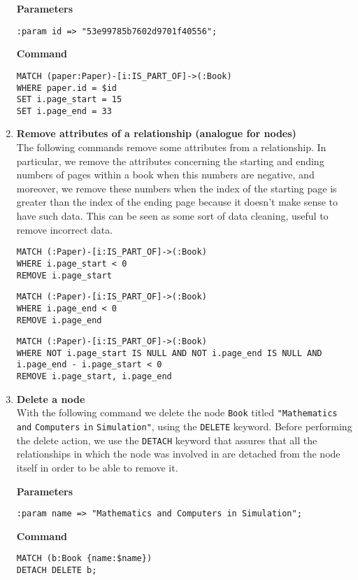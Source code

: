 \begin{enumerate}
    \textbf{Parameters}
    \begin{lstlisting}[label={lst:lstlisting13}]
:param id => "53e99785b7602d9701f40556";
    \end{lstlisting}
    \textbf{Command}
    \begin{lstlisting}[label={lst:lstlisting14}]
MATCH (paper:Paper)-[i:IS_PART_OF]->(:Book)
WHERE paper.id = $id
SET i.page_start = 15
SET i.page_end = 33
    \end{lstlisting}
    \item \textbf{Remove attributes of a relationship (analogue for nodes)}\\
    The following commands remove some attributes from a relationship.
    In particular, we remove the attributes concerning the starting and ending numbers of pages within a book when this numbers are negative, and moreover, we remove these numbers when the index of the starting page is greater than the index of the ending page because it doesn't make sense to have such data.
    This can be seen as some sort of data cleaning, useful to remove incorrect data.
    \begin{lstlisting}[label={lst:lstlisting15}]
MATCH (:Paper)-[i:IS_PART_OF]->(:Book)
WHERE i.page_start < 0
REMOVE i.page_start
    \end{lstlisting}
    \begin{lstlisting}[label={lst:lstlisting16}]
MATCH (:Paper)-[i:IS_PART_OF]->(:Book)
WHERE i.page_end < 0
REMOVE i.page_end
    \end{lstlisting}
    \begin{lstlisting}[label={lst:lstlisting17}]
MATCH (:Paper)-[i:IS_PART_OF]->(:Book)
WHERE NOT i.page_start IS NULL AND NOT i.page_end IS NULL AND i.page_end - i.page_start < 0
REMOVE i.page_start, i.page_end
    \end{lstlisting}
    \item \textbf{Delete a node}\\
    With the following command we delete the node \verb|Book| titled \verb|"Mathematics| \verb|and| \verb|Computers| \verb|in| \verb|Simulation"|, using the \verb|DELETE| keyword.
    Before performing the delete action, we use the \verb|DETACH| keyword that assures that all the relationships in which the node was involved in are detached from the node itself in order to be able to remove it.

    \textbf{Parameters}
    \begin{lstlisting}[label={lst:lstlisting18}]
:param name => "Mathematics and Computers in Simulation";
    \end{lstlisting}
    \textbf{Command}
    \begin{lstlisting}[label={lst:lstlisting19}]
MATCH (b:Book {name:$name})
DETACH DELETE b;
    \end{lstlisting}
\end{enumerate}


